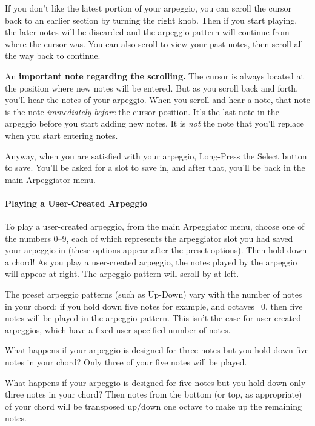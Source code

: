 \documentclass{article}
\begin{document}
If you don't like the latest portion of your arpeggio, you can scroll the cursor back to an earlier section by turning the right knob.  Then if you start playing, the later notes will be discarded and the arpeggio pattern will continue from where the cursor was.  You can also scroll to view your past notes, then scroll all the way back to continue.

An {\bf important note regarding the scrolling.}  The cursor is always located at the position where new notes will be entered.  But as you scroll back and forth, you'll hear the notes of your arpeggio.  When you scroll and hear a note, that note is the note {\it immediately before} the cursor position.  It's the last note in the arpeggio before you start adding new notes. It is {\it not} the note that you'll replace when you start entering notes. 

Anyway, when you are satisfied with your arpeggio, Long-Press the Select button to save.  You'll be asked for a slot to save in, and after that, you'll be back in the main Arpeggiator menu.

\paragraph{Playing a User-Created Arpeggio}

To play a user-created arpeggio, from the main Arpeggiator menu, choose one of the numbers 0--9, each of which represents the arpeggiator slot you had saved your arpeggio in (these options appear after the preset options).  Then hold down a chord!  As you play a user-created arpeggio, the notes played by the arpeggio will appear at right.  The arpeggio pattern will scroll by at left.


The preset arpeggio patterns (such as Up-Down) vary with the number of notes in your chord: if you hold down five notes for example, and octaves=0, then five notes will be played in the arpeggio pattern.  This isn't the case for user-created arpeggios, which have a fixed user-specified number of notes.

What happens if your arpeggio is designed for three notes but you hold down  five notes in your chord?  Only three of your five notes will be played.

What happens if your arpeggio is designed for five notes but you hold down only three notes in your chord?  Then notes from the bottom (or top, as appropriate) of your chord will be transposed up/down one octave to make up the remaining notes.
\end{document}
